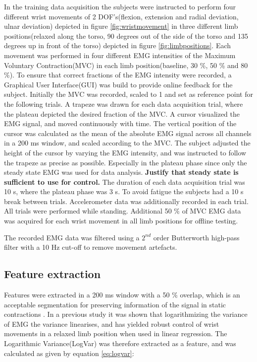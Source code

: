In the training data acquisition the subjects were instructed to perform four different wrist movements of 2 DOF's(flexion, extension and radial deviation, ulnar deviation) depicted in figure \ref{fig:wristmovement} in three different limb positions(relaxed along the torso, 90 degrees out of the side of the torso and 135 degrees up in front of the torso) depicted in figure \ref{fig:limbpositions}. Each movement was performed in four different EMG intensities of the Maximum Voluntary Contraction(MVC) in each limb position(baseline, 30 \%, 50 \% and 80 \%). To ensure that correct fractions of the EMG intensity were recorded, a Graphical User Interface(GUI) was build to provide online feedback for the subject. Initially the MVC was recorded, scaled to 1 and set as reference point for the following trials. A trapeze was drawn for each data acquisition trial, where the plateau depicted the desired fraction of the MVC. A cursor visualized the EMG signal, and moved continuously with time. The vertical position of the cursor was calculated as the mean of the absolute EMG signal across all channels in a 200 ms window, and scaled according to the MVC. The subject adjusted the height of the cursor by varying the EMG intensity, and was instructed to follow the trapeze as precise as possible. Especially in the plateau phase since only the steady state EMG was used for data analysis. \textbf{Justify that steady state is sufficient to use for control.} The duration of each data acquisition trial was 10 s, where the plateau phase was 3 s. To avoid fatigue the subjects had a 10 s break between trials. Accelerometer data was additionally recorded in each trial. All trials were performed while standing.
Additional 50 \% of MVC EMG data was acquired for each wrist movement in all limb positions for offline testing.

The recorded EMG data was filtered using a $2^{nd}$ order Butterworth high-pass filter with a 10 Hz cut-off to remove movement artefacts. 

\subsection{Feature extraction}
Features were extracted in a 200 ms window with a 50 \% overlap, which is an acceptable segmentation for preserving information of the signal in static contractions \cite{Farfan2010}.
In a previous study \cite{hahne2014} it was shown that logarithmizing the variance of EMG the variance linearises, and has yielded robust control of wrist movements in a relaxed limb position when used in linear regression. The Logarithmic Variance(LogVar) was therefore extracted as a feature, and was calculated as given by equation \ref{eq:logvar}:

